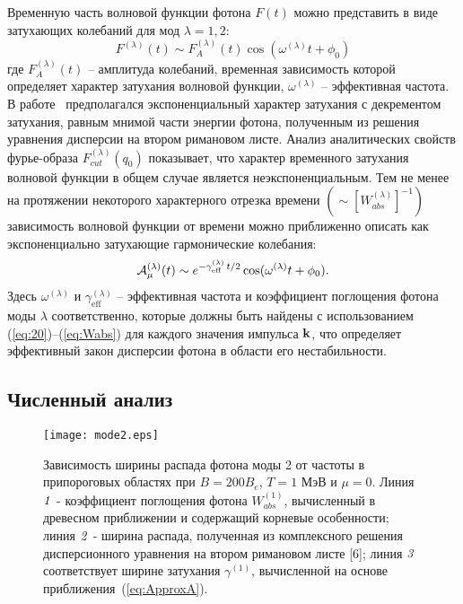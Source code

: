 Временную часть волновой функции фотона $F(t)$ можно представить в виде затухающих колебаний для мод $\lambda=1,2$:
\begin{equation}\label{eq:Fm}
	F^{(\lambda)}(t)\sim F^{(\lambda)}_A(t) \cos(\omega^{(\lambda)} t+\phi_0)
\end{equation}
где $F^{(\lambda)}_A(t)$ -- амплитуда колебаний,
временная зависимость которой определяет
характер затухания волновой функции,
$\omega^{(\lambda)}$ -- эффективная
частота. В работе~\cite{Shabad:1988}
предполагался экспоненциальный характер затухания с декрементом затухания, равным мнимой части энергии фотона, полученным из решения уравнения дисперсии на втором римановом листе. Анализ  аналитических свойств фурье-образа $F^{(\lambda)}_{cut}(q_0)$ показывает, что характер временного затухания волновой функции в общем случае является неэкспоненциальным. Тем не менее на протяжении некоторого характерного отрезка времени $(\sim [W^{(\lambda)}_{abs}]^{-1})$
зависимость волновой функции от времени можно приближенно описать как 
экспоненциально затухающие гармонические колебания:
%
\begin{equation}\label{eq:ApproxA}
{\cal A}^{(\lambda)}_\mu(t) \sim e^{- \gamma^{(\lambda)}_\text{eff} \, t/2} \cos 
(\omega^{(\lambda)} t + \phi_0).
\end{equation}
%
Здесь $\omega^{(\lambda)}$ и $\gamma^{(\lambda)}_\text{eff}$ -- эффективная 
частота и коэффициент  
поглощения фотона моды $\lambda$ соответственно, которые должны быть найдены с использованием 
(\ref{eq:20})--(\ref{eq:Wabs}) для каждого значения импульса ${\bf k}$, что определяет эффективный 
закон дисперсии фотона в области его нестабильности.


\subsection{Численный анализ}


\begin{figure}[t]\centering
	\texttt{[image: mode2.eps]}
	\caption{\label{fig:fig2}Зависимость ширины распада фотона моды 2 от частоты в припороговых областях при $B=200 B_e$, $T=1$ МэВ и $ \mu=0 $. Линия $ {\it 1} $ - коэффициент поглощения фотона $ W ^ {(1)}_{abs} $,
		вычисленный в древесном приближении и содержащий корневые особенности; линия $ {\it 2} $ - ширина распада, полученная из комплексного решения дисперсионного уравнения на втором римановом листе [6]; линия $ {\it 3} $ соответствует ширине затухания $ \gamma^{(1)}$, вычисленной на основе приближения~(\ref{eq:ApproxA}).}\label{fig:DampMode2}
\end{figure}

